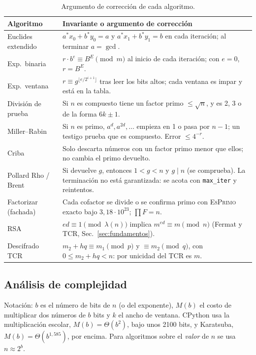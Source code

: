 \begin{table}[H]
\centering\small
\caption{Argumento de corrección de cada algoritmo.}
\label{tab:correccion}
\begin{tabularx}{\textwidth}{@{}l Y@{}}
\toprule
\textbf{Algoritmo} & \textbf{Invariante o argumento de corrección}\\
\midrule
Euclides extendido & $a^\ast x_0 + b^\ast y_0 = a$ y $a^\ast x_1 + b^\ast y_1 = b$ en cada iteración; al terminar $a = \gcd$.\\
Exp.\ binaria & $r \cdot b^{e} \equiv B^{E} \pmod m$ al inicio de cada iteración; con $e = 0$, $r = B^E$.\\
Exp.\ ventana & $r \equiv g^{\lfloor e/2^{i+1} \rfloor}$ tras leer los bits altos; cada ventana es impar y está en la tabla.\\
División de prueba & Si $n$ es compuesto tiene un factor primo $\le \sqrt n$, y es 2, 3 o de la forma $6k \pm 1$.\\
Miller--Rabin & Si $n$ es primo, $a^d, a^{2d}, \dots$ empieza en 1 o pasa por $n-1$; un testigo prueba que es compuesto. Error $\le 4^{-r}$.\\
Criba & Solo descarta números con un factor primo menor que ellos; no cambia el primo devuelto.\\
Pollard Rho / Brent & Si devuelve $g$, entonces $1 < g < n$ y $g \mid n$ (se comprueba). La terminación no está garantizada: se acota con \texttt{max\_iter} y reintentos.\\
Factorizar (fachada) & Cada cofactor se divide o se confirma primo con \textsc{EsPrimo} exacto bajo $3{,}18\cdot10^{23}$; $\prod F = n$.\\
RSA & $ed \equiv 1 \pmod{\lambda(n)}$ implica $m^{ed} \equiv m \pmod n$ (Fermat y TCR, Sec.~\ref{sec:fundamentos}).\\
Descifrado TCR & $m_2 + hq \equiv m_1 \pmod p$ y $\equiv m_2 \pmod q$, con $0 \le m_2 + hq < n$: por unicidad del TCR es $m$.\\
\bottomrule
\end{tabularx}
\end{table}

\subsection{Análisis de complejidad}
\label{sec:complejidad}

Notación: $b$ es el número de bits de $n$ (o del exponente), $M(b)$ el costo de
multiplicar dos números de $b$ bits y $k$ el ancho de ventana. CPython usa la
multiplicación escolar, $M(b) = \Theta(b^2)$, bajo unos 2100 bits, y Karatsuba,
$M(b) = \Theta(b^{1{,}585})$, por encima. Para algoritmos sobre el \emph{valor} de
$n$ se usa $n \approx 2^b$.

